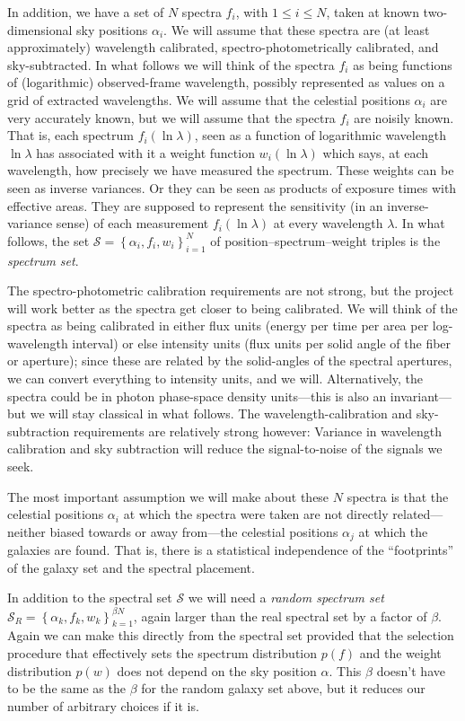 \documentclass{article}
\newcommand{\setof}[1]{\left\{{#1}\right\}}
\newcommand{\set}[1]{\mathscr{#1}}
\begin{document}
In addition, we have a set of $N$ spectra $f_i$, with $1\leq i\leq N$, taken at known two-dimensional sky positions $\alpha_i$.
We will assume that these spectra are (at least approximately) wavelength calibrated, spectro-photometrically calibrated, and sky-subtracted.
In what follows we will think of the spectra $f_i$ as being functions of (logarithmic) observed-frame wavelength, possibly represented as values on a grid of extracted wavelengths.
We will assume that the celestial positions $\alpha_i$ are very accurately known, but we will assume that the spectra $f_i$ are noisily known.
That is, each spectrum $f_i(\ln\lambda)$, seen as a function of logarithmic wavelength $\ln\lambda$ has associated with it a weight function $w_i(\ln\lambda)$ which says, at each wavelength, how precisely we have measured the spectrum.
These weights can be seen as inverse variances.
Or they can be seen as products of exposure times with effective areas.
They are supposed to represent the sensitivity (in an inverse-variance sense) of each measurement $f_i(\ln\lambda)$ at every wavelength $\lambda$.
In what follows, the set $\set{S}=\setof{\alpha_i, f_i, w_i}_{i=1}^N$ of position--spectrum--weight triples is the \emph{spectrum set}.

The spectro-photometric calibration requirements are not strong, but the project will work better as the spectra get closer to being calibrated.
We will think of the spectra as being calibrated in either flux units (energy per time per area per log-wavelength interval) or else intensity units (flux units per solid angle of the fiber or aperture); since these are related by the solid-angles of the spectral apertures, we can convert everything to intensity units, and we will.
Alternatively, the spectra could be in photon phase-space density units---this is also an invariant---but we will stay classical in what follows.
The wavelength-calibration and sky-subtraction requirements are relatively strong however:
Variance in wavelength calibration and sky subtraction will reduce the signal-to-noise of the signals we seek.

The most important assumption we will make about these $N$ spectra is that the celestial positions $\alpha_i$ at which the spectra were taken are not directly related---neither biased towards or away from---the celestial positions $\alpha_j$ at which the galaxies are found.
That is, there is a statistical independence of the ``footprints'' of the galaxy set and the spectral placement.

In addition to the spectral set $\set{S}$ we will need a \emph{random spectrum set} $\set{S}_R=\setof{\alpha_k,f_k,w_k}_{k=1}^{\beta N}$, again larger than the real spectral set by a factor of $\beta$.
Again we can make this directly from the spectral set provided that the selection procedure that effectively sets the spectrum distribution $p(f)$ and the weight distribution $p(w)$ does not depend on the sky position $\alpha$.
This $\beta$ doesn't have to be the same as the $\beta$ for the random galaxy set above, but it reduces our number of arbitrary choices if it is.
\end{document}
